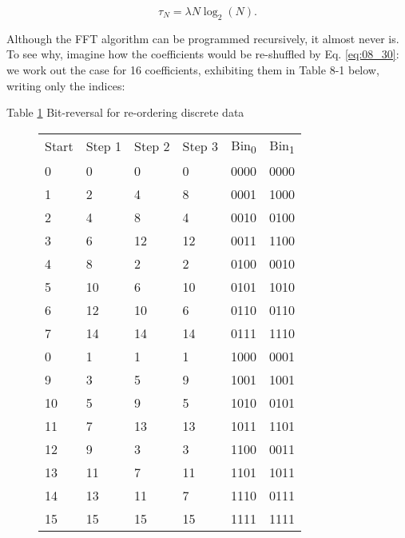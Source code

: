 \begin{equation}
\tau_{N} = \lambda N \log_{2}(N).
\end{equation}

Although the FFT algorithm can be programmed recursively, it almost never is. To see why, imagine how the coefficients would be re-shuffled by Eq. \ref{eq:08_30}: we work out the case for 16 coefficients, exhibiting them in Table 8-1 below, writing only the indices:

Table \ref{table:08_01} Bit-reversal for re-ordering discrete data

\begin{figure}
    \setlength{\tabcolsep}{1em}
    \begin{tabular}{llllll}
        \multicolumn{1}{c}{Start}  &
        \multicolumn{1}{c}{Step 1} &
        \multicolumn{1}{c}{Step 2} &
        \multicolumn{1}{c}{Step 3} & 
        \multicolumn{1}{c}{Bin\textsubscript{0}}  &
        \multicolumn{1}{c}{Bin\textsubscript{1}} \\
        0  &      0  &    0  &    0  &    0000 & 0000 \\
        1  &      2  &    4  &    8  &    0001 & 1000 \\
        2  &      4  &    8  &    4  &    0010 & 0100 \\
        3  &      6  &    12 &    12 &    0011 & 1100 \\
        4  &      8  &    2  &    2  &    0100 & 0010 \\
        5  &      10 &    6  &    10 &    0101 & 1010 \\
        6  &      12 &    10 &    6  &    0110 & 0110 \\
        7  &      14 &    14 &    14 &    0111 & 1110 \\
        0  &      1  &    1  &    1  &    1000 & 0001 \\
        9  &      3  &    5  &    9  &    1001 & 1001 \\
        10 &      5  &    9  &    5  &    1010 & 0101 \\
        11 &      7  &    13 &    13 &    1011 & 1101 \\
        12 &      9  &    3  &    3  &    1100 & 0011 \\
        13 &      11 &    7  &    11 &    1101 & 1011 \\
        14 &      13 &    11 &    7  &    1110 & 0111 \\
        15 &      15 &    15 &    15 &    1111 & 1111
    \end{tabular}
    \label{table:08_01}
\end{figure}


